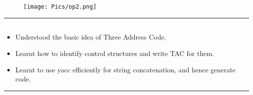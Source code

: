 \documentclass[12pt,letterpaper]{article}
\begin{document}
\subsection*{}
\begin{figure}[h]
    \centering
    \texttt{[image: Pics/op2.png]}
\end{figure}
\hrule
\subsection*{}
\begin{flushleft}
    \renewcommand{\labelitemi}{$\textendash$}
    \begin{itemize}
        \item Understood the basic idea of Three Address Code. 
        \item Learnt how to identify control structures and write TAC for them.
        \item Learnt to use yacc efficiently for string concatenation, and hence generate code.
    \end{itemize}
\end{flushleft}
\hrule
\end{document}
